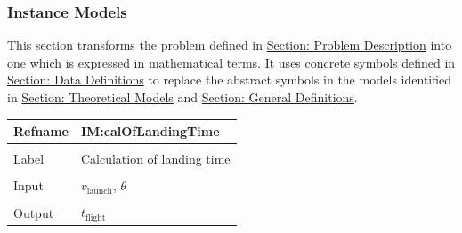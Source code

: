 \documentclass[12pt]{article}
\begin{document}
\subsubsection{Instance Models}
\label{Sec:IMs}
This section transforms the problem defined in \hyperref[Sec:ProbDesc]{Section: Problem Description} into one which is expressed in mathematical terms. It uses concrete symbols defined in \hyperref[Sec:DDs]{Section: Data Definitions} to replace the abstract symbols in the models identified in \hyperref[Sec:TMs]{Section: Theoretical Models} and \hyperref[Sec:GDs]{Section: General Definitions}.

\vspace{\baselineskip}
\noindent
\begin{minipage}{\textwidth}
\begin{tabular}{>{\raggedright}p{}>{\raggedright\arraybackslash}p{}}
\toprule \textbf{Refname} & \textbf{IM:calOfLandingTime}
\label{IM:calOfLandingTime}
\\ \midrule \\
Label & Calculation of landing time
        
\\ \midrule \\
Input & ${v_{\text{launch}}}$, $θ$
        
\\ \midrule \\
Output & ${t_{\text{flight}}}$
         

\end{tabular}
\end{minipage}
\end{document}

